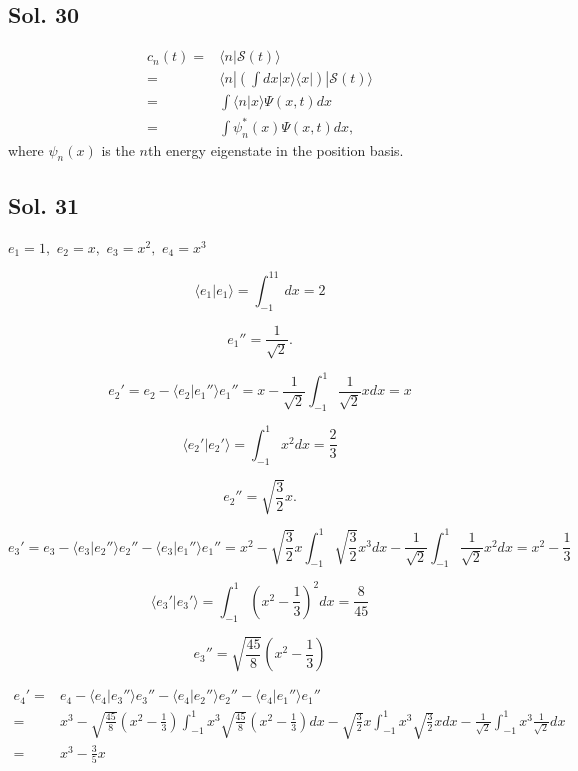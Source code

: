 \subsection*{Sol. 30}
\begin{align*}
    c_n(t)=&\langle n|\mathcal{S}(t)\rangle\\
    =& \langle n|\left(\int dx|x\rangle \langle x |\right)|\mathcal{S}(t)\rangle\\
    =& \int \langle n|x\rangle \Psi(x,t)dx\\
    =&\int \psi_n^*(x) \Psi(x,t)dx,
\end{align*}
where $\psi_n(x)$ is the $n$th energy eigenstate in the position basis.

\subsection*{Sol. 31}
$e_1=1,$ $e_2=x,$ $e_3=x^2,$ $e_4=x^3$

$$
\langle e_1|e_1\rangle=\int_{-1}^11dx=2
$$

$$e_1''=\frac{1}{\sqrt{2}}.$$

$$
e_2' = e_2-\langle e_2|e_1''\rangle e_1''=x-\frac{1}{\sqrt{2}}\int_{-1}^1\frac{1}{\sqrt{2}}xdx=x
$$

$$
\langle e_2'|e_2'\rangle = 
\int_{-1}^1x^2dx = \frac{2}{3}
$$

$$e_2''=\sqrt{\frac{3}{2}}x.$$



$$
e_3' = e_3-
\langle e_3|e_2''\rangle e_2''-
\langle e_3|e_1''\rangle e_1''=
x^2-
\sqrt{\frac{3}{2}}x\int_{-1}^1\sqrt{\frac{3}{2}}x^3dx 
-\frac{1}{\sqrt{2}}\int_{-1}^1\frac{1}{\sqrt{2}}x^2dx
=x^2-\frac{1}{3}
$$

$$
\langle e_3'|e_3'\rangle=
\int_{-1}^1
\left(x^2-\frac{1}{3}\right)^2dx = \frac{8}{45}
$$

$$
e_3''
=\sqrt{\frac{45}{8}}\left(x^2-\frac{1}{3}\right)
$$


\begin{align*}
e_4' =& e_4-
\langle e_4|e_3''\rangle e_3''-
\langle e_4|e_2''\rangle e_2''-
\langle e_4|e_1''\rangle e_1''\\
=&
x^3-
\sqrt{\frac{45}{8}}\left(x^2-\frac{1}{3}\right)
\int_{-1}^1x^3\sqrt{\frac{45}{8}}\left(x^2-\frac{1}{3}\right)dx 
-\sqrt{\frac{3}{2}}x
\int_{-1}^1x^3\sqrt{\frac{3}{2}}xdx
-\frac{1}{\sqrt{2}}
\int_{-1}^1x^3\frac{1}{\sqrt{2}}dx\\
=&x^3-\frac{3}{5}x
\end{align*}

